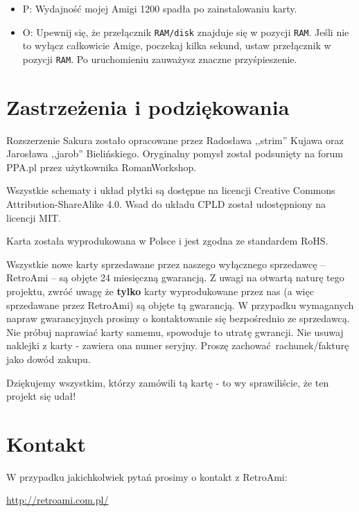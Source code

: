 \documentclass[10pt,a4paper]{article}
\begin{document}
\begin{itemize}
	\item P: Wydajność mojej Amigi 1200 spadła po zainstalowaniu karty.
	\item O: Upewnij się, że przełącznik {\tt RAM/disk} znajduje się w pozycji {\tt RAM}. Jeśli nie to wyłącz całkowicie Amige, poczekaj kilka sekund, ustaw przełącznik w pozycji {\tt RAM}. Po uruchomieniu zauważysz znaczne przyśpieszenie.
\end{itemize}

\section*{Zastrzeżenia i podziękowania}

Rozszerzenie Sakura zostało opracowane przez Radosława ,,strim'' Kujawa oraz Jarosława ,,jarob'' Bielińskiego. Oryginalny pomysł został podsunięty na forum PPA.pl przez użytkownika RomanWorkshop. 

Wszystkie schematy i układ płytki są dostępne na licencji Creative Commons Attribution-ShareAlike 4.0. Wsad do układu CPLD został udostępniony na licencji MIT.

Karta została wyprodukowana w Polsce i jest zgodna ze standardem RoHS. 

Wszystkie nowe karty sprzedawane przez naszego wyłącznego sprzedawcę -- RetroAmi -- są objęte 24 miesięczną  gwarancją. Z uwagi na otwartą naturę tego projektu, zwróć uwagę że {\bf tylko} karty wyprodukowane przez nas (a więc sprzedawane przez RetroAmi) są objęte tą gwarancją. W przypadku wymaganych napraw gwarancyjnych prosimy o kontaktowanie się bezpośrednio ze sprzedawcą. Nie próbuj naprawiać karty samemu, spowoduje to utratę gwrancji. Nie usuwaj naklejki z karty - zawiera ona numer seryjny. Proszę zachować rachunek/fakturę jako dowód zakupu.

Dziękujemy wszystkim, którzy zamówili tą kartę - to wy sprawiliście, że ten projekt się udał!

\section*{Kontakt}

W przypadku jakichkolwiek pytań prosimy o kontakt z RetroAmi:

\url{http://retroami.com.pl/} 
\end{document}
